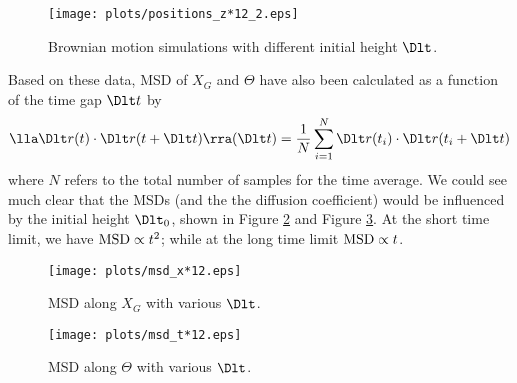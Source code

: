 \documentclass[fleqn,10pt]{InternshipReport-ENS-PSL}
\begin{document}
\begin{figure}[ht]
\centering
\texttt{[image: plots/positions\_z*12\_2.eps]}
\caption{Brownian motion simulations with different initial height $\Dlt$.}
\label{zunfixvar}
\end{figure}





Based on these data, MSD of $X_G$ and $\Theta$ have also been calculated as a function of the time gap $\Dlt t$ by
$$ \lla \Dlt r(t) \cdot \Dlt r(t + \Dlt t) \rra (\Dlt t) = \frac{1}{N} \sum_{i=1}^{N} \Dlt r(t_i) \cdot \Dlt r(t_i + \Dlt t) $$
where $N$ refers to the total number of samples for the time average. We could see much clear that the MSDs (and the the diffusion coefficient) would be influenced by the initial height $\Dlt_0$, shown in Figure \ref{MSDx} and Figure \ref{MSDt}. At the short time limit, we have $\mathrm{MSD} \propto t^2$; while at the long time limit $\mathrm{MSD} \propto t$.

\begin{figure}[ht]
\centering
\texttt{[image: plots/msd\_x*12.eps]}
\caption{MSD along $X_G$ with various $\Dlt$.}
\label{MSDx}
\end{figure}


\begin{figure}[ht]
\centering
\texttt{[image: plots/msd\_t*12.eps]}
\caption{MSD along $\Theta$ with various $\Dlt$.}
\label{MSDt}
\end{figure}




\end{document}
